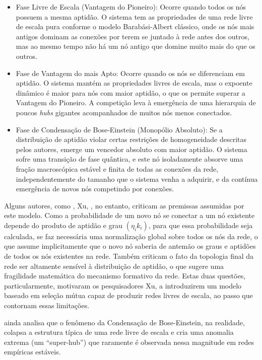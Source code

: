 \documentclass[12pt,oneside,a4paper,brazil,sumario=tradicional]{abntex2}
\begin{document}
\begin{itemize}
  \item Fase Livre de Escala (Vantagem do Pioneiro): Ocorre quando todos os nós possuem a mesma aptidão. O sistema tem as propriedades de uma rede livre de escala pura conforme o modelo Barabási-Albert clássico, onde os nós mais antigos dominam as conexões por terem se juntado à rede antes dos outros, mas ao mesmo tempo não há um nó antigo que domine muito mais do que os outros.
\end{itemize}
\begin{itemize}
  \item Fase de Vantagem do mais Apto: Ocorre quando os nós se diferenciam em aptidão. O sistema mantém as propriedades livres de escala, mas o expoente dinâmico é maior para nós com maior aptidão, o que os permite superar a Vantagem do Pioneiro. A competição leva à emergência de uma hierarquia de poucos \textit{hubs }gigantes acompanhados de muitos nós menos conectados.
  \item Fase de Condensação de Bose-Einstein (Monopólio Absoluto): Se a distribuição de aptidão violar certas restrições de homogeneidade descritas pelos autores, emerge um vencedor absoluto com maior aptidão. O sistema sofre uma transição de fase quântica, e este nó isoladamente absorve uma fração macroscópica estável e finita de todas as conexões da rede, independentemente do tamanho que o sistema venha a adquirir, e da contínua emergência de novos nós competindo por conexões.
\end{itemize}
Alguns autores, como , Xu, , no entanto, criticam as premissas assumidas por este modelo. Como a probabilidade de um novo nó se conectar a um nó existente depende do produto de aptidão e grau $(\eta_{i}k_{i})$, para que essa probabilidade seja calculada, se faz necessária uma normalização global sobre todos os nós da rede, o que assume implicitamente que o novo nó saberia de antemão os graus e aptidões de todos os nós existentes na rede.  Também criticam o fato da topologia final da rede ser altamente sensível à distribuição de aptidão, o que sugere uma fragilidade matemática do mecanismo formativo da rede. Estas duas questões, particularmente, motivaram os pesquisadores Xu,  a introduzirem um modelo baseado em seleção mútua capaz de produzir redes livres de escala, ao passo que contornam essas limitações.

 ainda analisa que o fenômeno da Condensação de Bose-Einstein, na realidade, colapsa a estrutura típica de uma rede livre de escala e cria uma anomalia extrema (um “super-hub”) que raramente é observada nessa magnitude em redes empíricas estáveis.
\end{document}
